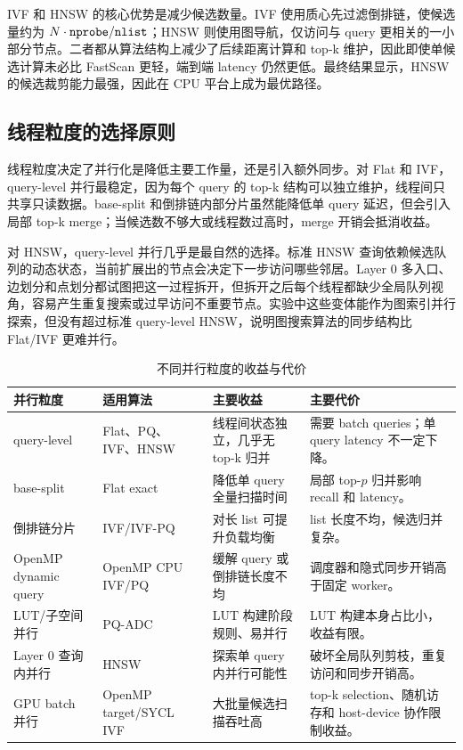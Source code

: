 \documentclass[11pt,a4paper]{article}
\newcommand{\code}[1]{\texttt{\detokenize{#1}}}
\begin{document}
IVF 和 HNSW 的核心优势是减少候选数量。IVF 使用质心先过滤倒排链，使候选量约为 $N\cdot\code{nprobe}/\code{nlist}$；HNSW 则使用图导航，仅访问与 query 更相关的一小部分节点。二者都从算法结构上减少了后续距离计算和 top-k 维护，因此即使单候选计算未必比 FastScan 更轻，端到端 latency 仍然更低。最终结果显示，HNSW 的候选裁剪能力最强，因此在 CPU 平台上成为最优路径。

\subsection{线程粒度的选择原则}

线程粒度决定了并行化是降低主要工作量，还是引入额外同步。对 Flat 和 IVF，query-level 并行最稳定，因为每个 query 的 top-k 结构可以独立维护，线程间只共享只读数据。base-split 和倒排链内部分片虽然能降低单 query 延迟，但会引入局部 top-k merge；当候选数不够大或线程数过高时，merge 开销会抵消收益。

对 HNSW，query-level 并行几乎是最自然的选择。标准 HNSW 查询依赖候选队列的动态状态，当前扩展出的节点会决定下一步访问哪些邻居。Layer 0 多入口、边划分和点划分都试图把这一过程拆开，但拆开之后每个线程都缺少全局队列视角，容易产生重复搜索或过早访问不重要节点。实验中这些变体能作为图索引并行探索，但没有超过标准 query-level HNSW，说明图搜索算法的同步结构比 Flat/IVF 更难并行。

\begin{table}[H]\centering\scriptsize
\caption{不同并行粒度的收益与代价}
\label{tab:granularity_tradeoff}
\begin{tabularx}{\textwidth}{>{\raggedright\arraybackslash}p{}>{\raggedright\arraybackslash}p{}>{\raggedright\arraybackslash}p{}>{\raggedright\arraybackslash}X}
\toprule
并行粒度 & 适用算法 & 主要收益 & 主要代价 \\
\midrule
query-level & Flat、PQ、IVF、HNSW & 线程间状态独立，几乎无 top-k 归并 & 需要 batch queries；单 query latency 不一定下降。 \\
base-split & Flat exact & 降低单 query 全量扫描时间 & 局部 top-$p$ 归并影响 recall 和 latency。 \\
倒排链分片 & IVF/IVF-PQ & 对长 list 可提升负载均衡 & list 长度不均，候选归并复杂。 \\
OpenMP dynamic query & OpenMP CPU IVF/PQ & 缓解 query 或倒排链长度不均 & 调度器和隐式同步开销高于固定 worker。 \\
LUT/子空间并行 & PQ-ADC & LUT 构建阶段规则、易并行 & LUT 构建本身占比小，收益有限。 \\
Layer 0 查询内并行 & HNSW & 探索单 query 内并行可能性 & 破坏全局队列剪枝，重复访问和同步开销高。 \\
GPU batch 并行 & OpenMP target/SYCL IVF & 大批量候选扫描吞吐高 & top-k selection、随机访存和 host-device 协作限制收益。 \\
\bottomrule
\end{tabularx}
\end{table}
\end{document}
